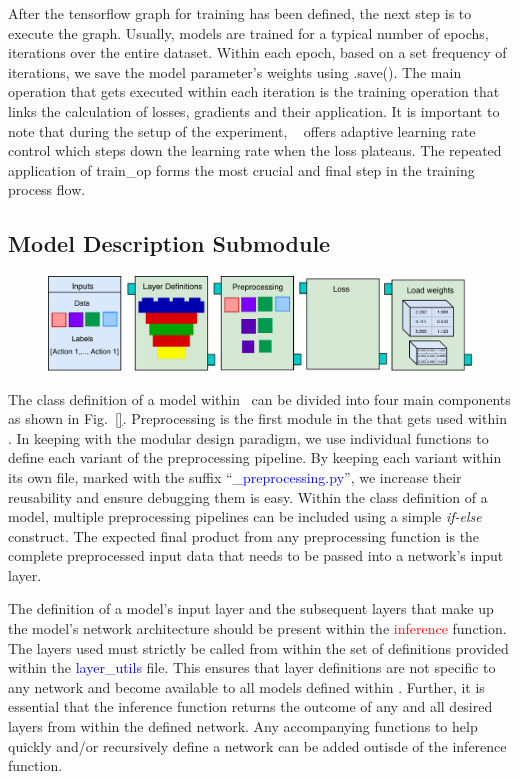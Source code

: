\documentclass{llncs}
\begin{document}
After the tensorflow graph for training has been defined, the next step is to execute the graph. 
Usually, models are trained for a typical number of epochs, iterations over the entire dataset.
Within each epoch, based on a set frequency of iterations, we save the model parameter's weights using \checkpoint.save().
The main operation that gets executed within each iteration is the training operation that links the calculation of losses, gradients and their application.
It is important to note that during the setup of the experiment, \acro~ offers adaptive learning rate control which steps down the learning rate when the loss plateaus.
The repeated application of train\_op forms the most crucial and final step in the training process flow.

\subsection{Model Description Submodule}
\label{sec:modeldesc}
\begin{figure}[b!]
\centering
\includegraphics[width=\columnwidth]{images/model_submodule.pdf}
\caption{}
\label{fig:model_submodule}
\end{figure}

The class definition of a model within \acro~can be divided into four main components as shown in Fig.~\ref{}. 
Preprocessing is the first module in the \model that gets used within \data.
In keeping with the modular design paradigm, we use individual functions to define each variant of the preprocessing pipeline.
By keeping each variant within its own file, marked with the suffix ``\textcolor{blue}{\_preprocessing.py}'', we increase their reusability and ensure debugging them is easy.
Within the class definition of a model, multiple preprocessing pipelines can be included using a simple \textit{if-else} construct.
The expected final product from any preprocessing function is the complete preprocessed input data that needs to be passed into a network's input layer.

The definition of a model's input layer and the subsequent layers that make up the model's network architecture should be present within the \textcolor{red}{inference} function.
The layers used must strictly be called from within the set of definitions provided within the \textcolor{blue}{layer\_utils} file.
This ensures that layer definitions are not specific to any network and become available to all models defined within \acro.
Further, it is essential that the inference function returns the outcome of any and all desired layers from within the defined network.
Any accompanying functions to help quickly and/or recursively define a network can be added outisde of the inference function.
\end{document}
